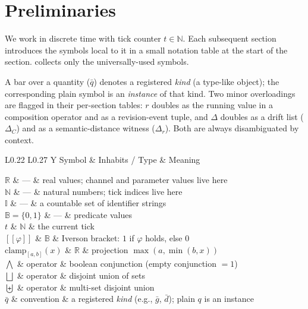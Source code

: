 \documentclass[journal,onecolumn,11pt]{IEEEtran}
\theoremstyle{definition}
\newcommand{\notationtable}[3]{%
  \begin{table}[ht]
  \centering
  \caption{#1}
  \label{#2}
  \small
  \renewcommand{\arraystretch}{1.1}
  \begin{tabularx}{\linewidth}{L{0.22\linewidth} L{0.27\linewidth} Y}
  \toprule
  Symbol & Inhabits / Type & Meaning \\
  \midrule
  #3
  \bottomrule
  \end{tabularx}
  \end{table}%
}
\begin{document}
\section{Preliminaries}
\label{sec:notation}

We work in discrete time with tick counter $t \in \mathbb{N}$. Each subsequent section introduces the symbols local to it in a small notation table at the start of the section.  collects only the universally-used symbols.

A bar over a quantity ($\bar{q}$) denotes a registered \emph{kind} (a type-like object); the corresponding plain symbol is an \emph{instance} of that kind. Two minor overloadings are flagged in their per-section tables: $r$ doubles as the running value in a composition operator and as a revision-event tuple, and $\Delta$ doubles as a drift list ($\Delta_C$) and as a semantic-distance witness ($\Delta_r$). Both are always disambiguated by context.

\notationtable{Universal symbols.}{tab:notation-prelim}{
$\mathbb{R}$              & ---                          & real values; channel and parameter values live here \\
$\mathbb{N}$              & ---                          & natural numbers; tick indices live here \\
$\mathbb{I}$              & ---                          & a countable set of identifier strings \\
$\mathbb{B} = \{0,1\}$    & ---                          & predicate values \\
$t$                       & $\mathbb{N}$                 & the current tick \\
$[\![\varphi]\!]$         & $\mathbb{B}$                 & Iverson bracket: $1$ if $\varphi$ holds, else $0$ \\
$\mathrm{clamp}_{[a,b]}(x)$ & $\mathbb{R}$               & projection $\max(a, \min(b, x))$ \\
$\bigwedge$               & operator                     & boolean conjunction (empty conjunction $=1$) \\
$\bigsqcup$               & operator                     & disjoint union of sets \\
$\biguplus$               & operator                     & multi-set disjoint union \\
$\bar{q}$                 & convention                   & a registered \emph{kind} (e.g., $\bar{g}$, $\bar{d}$); plain $q$ is an instance \\
}
\end{document}
